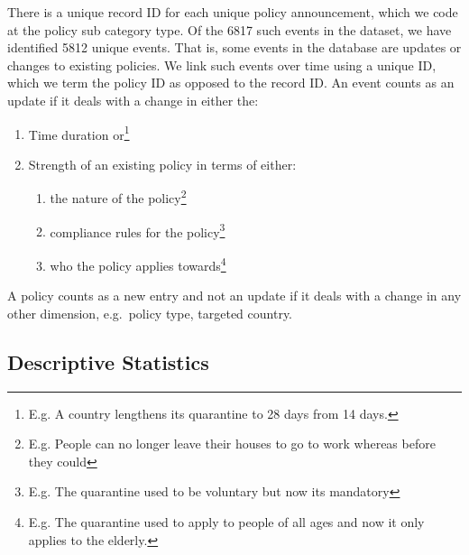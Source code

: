 \documentclass[]{article}
\providecommand{\tightlist}{%
  \setlength{\itemsep}{0pt}\setlength{\parskip}{0pt}}
\let\rmarkdownfootnote\footnote%
\def\footnote{\protect\rmarkdownfootnote}
\begin{document}
There is a unique record ID for each unique policy announcement, which we code at the policy sub category type. Of the 6817 such events in the dataset, we have identified 5812 unique events. That is, some events in the database are updates or changes to existing policies. We link such events over time using a unique ID, which we term the policy ID as opposed to the record ID. An event counts as an update if it deals with a change in either the:

\begin{enumerate}
\def\labelenumi{\arabic{enumi}.}
\tightlist
\item
  Time duration or\footnote{E.g. A country lengthens its quarantine to 28 days from 14 days.}
\item
  Strength of an existing policy in terms of either:

  \begin{enumerate}
  \def\labelenumii{\alph{enumii}.}
  \tightlist
  \item
    the nature of the policy\footnote{E.g. People can no longer leave their houses to go to work whereas before they could}
  \item
    compliance rules for the policy\footnote{E.g. The quarantine used to be voluntary but now its mandatory}
  \item
    who the policy applies towards\footnote{E.g. The quarantine used to apply to people of all ages and now it only applies to the elderly.}
  \end{enumerate}
\end{enumerate}

A policy counts as a new entry and not an update if it deals with a change in any other dimension, e.g.~policy type, targeted country.

\hypertarget{descriptive-statistics}{%
\subsection{Descriptive Statistics}\label{descriptive-statistics}}
\end{document}
